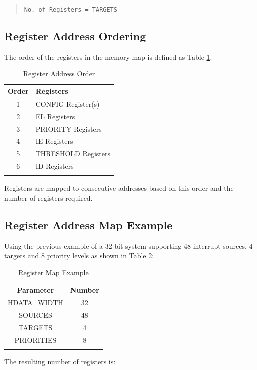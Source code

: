 \begin{quote}
\texttt{No.\ of\ Registers\ =\ TARGETS}
\end{quote}

\subsection{Register Address Ordering}

The order of the registers in the memory map is defined as Table \ref{tab:REGMAP}.

\begin{longtable}[]{@{}cl@{}}	
	\toprule 
	\textbf{Order} & \textbf{Registers}\\
	\midrule
	\endhead 
	1 & CONFIG Register(s)\\
	2 & EL Registers\\
	3 & PRIORITY Registers\\
	4 & IE Registers\\
	5 & THRESHOLD Registers\\
	6 & ID Registers\\
	\bottomrule 	
	\caption{Register Address Order}
	\label{tab:REGMAP}
\end{longtable}

Registers are mapped to consecutive addresses based on this order and the
number of registers required.  

\subsection{Register Address Map Example}

Using the previous example of a 32 bit system supporting 48 interrupt sources, 4 targets and 8 priority levels as shown in Table \ref{tab:REGMAPEX}:

\begin{longtable}[c]{@{}cc@{}}	
		\toprule 
		\textbf{Parameter} & \textbf{Number}\\
		\midrule 
		\endhead
		HDATA\_WIDTH & 32\\
		SOURCES & 48\\
		TARGETS & 4\\
		PRIORITIES & 8\\
		\bottomrule 	
 
	\caption{Register Map Example}
	\label{tab:REGMAPEX}
\end{longtable}

The resulting number of registers is:


